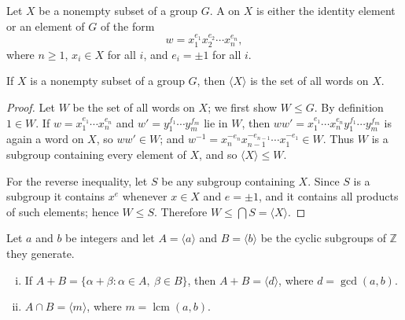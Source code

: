 \begin{definition}[Word]
	Let \(X\) be a nonempty subset of a group \(G\). A  on \(X\) is either the
	identity element or an element of \(G\) of the form
	\[
		w = x_1^{e_1}x_2^{e_2}\cdots x_n^{e_n},
	\]
	where \(n \geq 1\), \(x_i \in X\) for all \(i\), and \(e_i = \pm 1\) for all \(i\).
\end{definition}

\begin{proposition}\label{prop:words}
	If \(X\) is a nonempty subset of a group \(G\), then \(\langle X\rangle\) is the set of
	all words on \(X\).
\end{proposition}

\begin{proof}
	Let \(W\) be the set of all words on \(X\); we first show \(W \leq G\). By definition
	\(1 \in W\). If \(w = x_1^{e_1}\cdots x_n^{e_n}\) and
	\(w' = y_1^{f_1}\cdots y_m^{f_m}\) lie in \(W\), then
	\(ww' = x_1^{e_1}\cdots x_n^{e_n}y_1^{f_1}\cdots y_m^{f_m}\) is again a word on \(X\),
	so \(ww' \in W\); and
	\(w^{-1} = x_n^{-e_n}x_{n-1}^{-e_{n-1}}\cdots x_1^{-e_1} \in W\). Thus \(W\) is a
	subgroup containing every element of \(X\), and so \(\langle X\rangle \leq W\).

	For the reverse inequality, let \(S\) be any subgroup containing \(X\). Since \(S\) is a
	subgroup it contains \(x^e\) whenever \(x \in X\) and \(e = \pm 1\), and it contains all
	products of such elements; hence \(W \leq S\). Therefore
	\(W \leq \bigcap S = \langle X\rangle\).
\end{proof}

\begin{proposition}\label{prop:gcd-lcm}
	Let \(a\) and \(b\) be integers and let \(A = \langle a\rangle\) and
	\(B = \langle b\rangle\) be the cyclic subgroups of \(\mathbb{Z}\) they generate.
	\begin{enumerate}[(i)]
		\item If \(A + B = \{\alpha + \beta : \alpha \in A,\ \beta \in B\}\), then
		      \(A + B = \langle d\rangle\), where \(d = \gcd(a,b)\).
		\item \(A \cap B = \langle m\rangle\), where \(m = \operatorname{lcm}(a,b)\).
	\end{enumerate}
\end{proposition}

